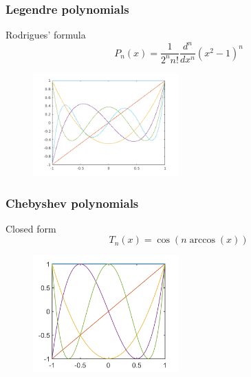 \documentclass{beamer}
\begin{document}
\begin{frame}

\frametitle{Legendre polynomials}

\begin{block}{Rodrigues' formula}
\begin{equation*}
P_n(x) = \frac{1}{2^n n!} \frac{d^n}{dx^n} (x^2-1)^n
\end{equation*}
\end{block}

\begin{figure}
\includegraphics[width=0.5\textwidth]{legendreP.png}
\end{figure}

\end{frame}

\begin{frame}

\frametitle{Chebyshev polynomials}

\begin{block}{Closed form}
\begin{equation*}
T_n(x) = \cos \left ( n \arccos \left ( x \right ) \right )
\end{equation*}
\end{block}

\begin{figure}
\includegraphics[width=0.5\textwidth]{ChebPoly.png}
\end{figure}

\end{frame}
\end{document}
